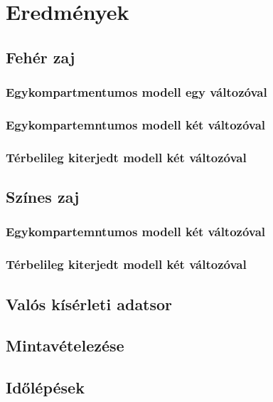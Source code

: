 \section{Eredmények}

\subsection{Fehér zaj}

\subsubsection{Egykompartmentumos modell egy változóval}

\subsubsection{Egykompartemntumos modell két változóval}

\subsubsection{Térbelileg kiterjedt modell két változóval}



\subsection{Színes zaj}

\subsubsection{Egykompartemntumos modell két változóval}

\subsubsection{Térbelileg kiterjedt modell két változóval}

\subsection{Valós kísérleti adatsor}

\subsection{Mintavételezése}

\subsection{Időlépések}